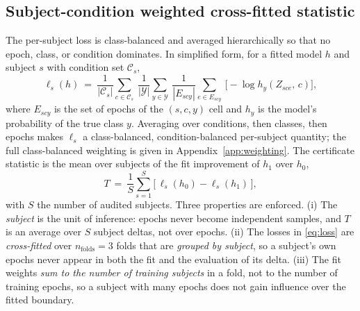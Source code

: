 \subsection{Subject-condition weighted cross-fitted statistic}
\label{sec:b3-stat}
The per-subject loss is class-balanced and averaged hierarchically so that no epoch, class, or condition
dominates. In simplified form, for a fitted model $h$ and subject $s$ with condition set $\mathcal{C}_s$,
\begin{equation}
  \ell_s(h)\ =\ \frac{1}{|\mathcal{C}_s|}\sum_{c\in\mathcal{C}_s}\ \frac{1}{|\mathcal{Y}|}\sum_{y\in\mathcal{Y}}\
  \frac{1}{|E_{scy}|}\sum_{e\in E_{scy}}\ \bigl[-\log h_y(Z_{sce},\,c)\bigr],
  \label{eq:loss}
\end{equation}
where $E_{scy}$ is the set of epochs of the $(s,c,y)$ cell and $h_y$ is the model's probability of the true
class $y$. Averaging over conditions, then classes, then epochs makes $\ell_s$ a class-balanced,
condition-balanced per-subject quantity; the full class-balanced weighting is given in
Appendix~\ref{app:weighting}. The
certificate statistic is the mean over subjects of the fit improvement of $h_1$ over $h_0$,
\begin{equation}
  T\ =\ \frac{1}{S}\sum_{s=1}^{S}\bigl[\,\ell_s(h_0)-\ell_s(h_1)\,\bigr],
  \label{eq:Tstat}
\end{equation}
with $S$ the number of audited subjects. Three properties are enforced. (i) The \emph{subject} is the unit
of inference: epochs never become independent samples, and $T$ is an average over $S$ subject deltas, not
over epochs. (ii) The losses in \eqref{eq:loss} are \emph{cross-fitted} over $n_{\text{folds}}=3$ folds that
are \emph{grouped by subject}, so a subject's own epochs never appear in both the fit and the evaluation
of its delta. (iii) The fit weights \emph{sum to the number of training subjects} in a fold, not to the
number of training epochs, so a subject with many epochs does not gain influence over the fitted boundary.

